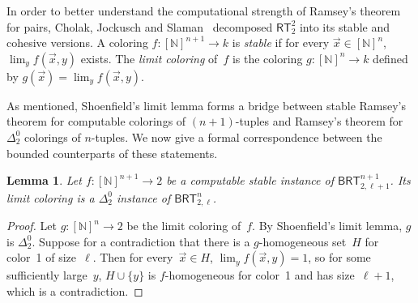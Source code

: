 \documentclass{article}
\newcommand{\RT}[0]{\mathsf{RT}}
\newcommand{\BRT}[0]{\mathsf{BRT}}
\newcommand{\NN}[0]{\mathbb{N}}
\numberwithin{theorem}{section}
\newtheorem{lemma}[theorem]{Lemma}
\begin{document}
In order to better understand the computational strength of Ramsey's theorem for pairs, Cholak, Jockusch and Slaman~\cite{cholak2001strength} decomposed $\RT^2_2$ into its stable and cohesive versions.
A coloring $f : [\NN]^{n+1} \to k$ is \emph{stable} if for every $\vec{x} \in [\NN]^n$, $\lim_y f(\vec{x}, y)$ exists. The \emph{limit coloring} of~$f$ is the coloring $g : [\NN]^n \to k$ defined by $g(\vec{x}) = \lim_y f(\vec{x}, y)$. 

As mentioned, Shoenfield's limit lemma forms a bridge between stable Ramsey's theorem for computable colorings of $(n+1)$-tuples and Ramsey's theorem for $\Delta^0_2$ colorings of $n$-tuples. We now give a formal correspondence between the bounded counterparts of these statements. 

\begin{lemma}
Let $f : [\NN]^{n+1} \to 2$ be a computable stable instance of $\BRT^{n+1}_{2, \ell+1}$.
Its limit coloring is a $\Delta^0_2$ instance of $\BRT^n_{2, \ell}$.
\end{lemma}
\begin{proof}
Let $g : [\NN]^n \to 2$ be the limit coloring of~$f$. By Shoenfield's limit lemma, $g$ is $\Delta^0_2$. Suppose for a contradiction that there is a $g$-homogeneous set~$H$ for color~1 of size~$\ell$. Then for every~$\vec{x} \in H$, $\lim_y f(\vec{x}, y) = 1$, so for some sufficiently large~$y$, $H \cup \{y\}$ is $f$-homogeneous for color~1 and has size~$\ell+1$, which is a contradiction.
\end{proof}
\end{document}
